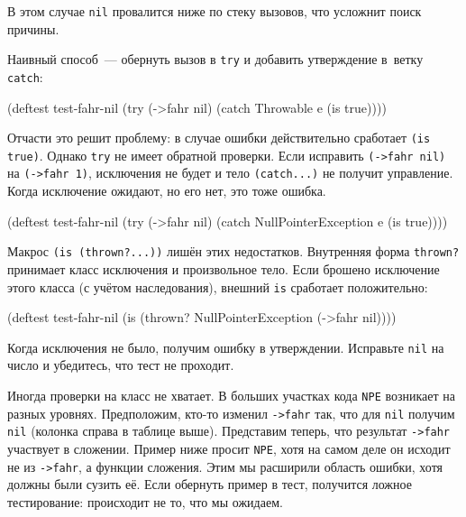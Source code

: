 \fi


\noindent
В этом случае \verb|nil| провалится ниже по стеку вызовов, что усложнит поиск
причины.

Наивный способ~--- обернуть вызов в \verb|try| и добавить утверждение в~ветку
\verb|catch|:

\begin{english}
  \begin{clojure}
(deftest test-fahr-nil
  (try
    (->fahr nil)
    (catch Throwable e
      (is true))))
  \end{clojure}
\end{english}

Отчасти это решит проблему: в случае ошибки действительно сработает
\verb|(is true)|. Однако \verb|try| не имеет обратной проверки. Если исправить
\verb|(->fahr nil)| на \verb|(->fahr 1)|, исключения не будет и тело
\verb|(catch...)| не получит управление. Когда исключение ожидают, но его нет,
это тоже ошибка.


\begin{english}
  \begin{clojure}
(deftest test-fahr-nil
  (try
    (->fahr nil)
    (catch NullPointerException e
      (is true))))
  \end{clojure}
\end{english}

Макрос \verb|(is (thrown?...))| лишён этих недостатков. Внутренняя форма
\verb|thrown?| принимает класс исключения и произвольное тело. Если брошено
исключение этого класса (с учётом наследования), внешний \verb|is| сработает
положительно:

\begin{english}
  \begin{clojure}
(deftest test-fahr-nil
  (is (thrown? NullPointerException
               (->fahr nil))))
  \end{clojure}
\end{english}

Когда исключения не было, получим ошибку в утверждении. Исправьте \verb|nil|
на число и убедитесь, что тест не проходит.


Иногда проверки на класс не хватает. В больших участках кода \verb|NPE|
возникает на разных уровнях. Предположим, кто-то изменил \verb|->fahr| так, что
для \verb|nil| получим \verb|nil| (колонка справа в таблице выше). Представим
теперь, что результат \verb|->fahr| участвует в сложении. Пример ниже просит
\verb|NPE|, хотя на самом деле он исходит не из \verb|->fahr|, а функции
сложения. Этим мы расширили область ошибки, хотя должны были сузить её. Если
обернуть пример в тест, получится ложное тестирование: происходит не то, что мы
ожидаем.

